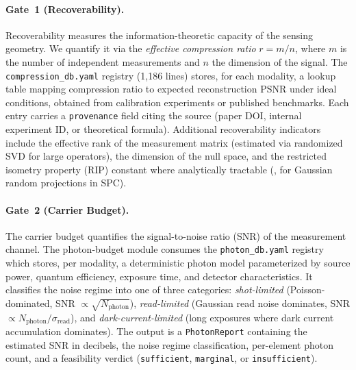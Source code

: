 \paragraph{Gate~1 (Recoverability).}
Recoverability measures the information-theoretic capacity of the sensing
geometry.  We quantify it via the \emph{effective compression ratio}
$r = m / n$, where $m$ is the number of independent measurements and $n$
the dimension of the signal.  The \texttt{compression\_db.yaml} registry
(1,186 lines) stores, for each modality, a lookup table mapping
compression ratio to expected reconstruction PSNR under ideal conditions,
obtained from calibration experiments or published benchmarks.  Each entry
carries a \texttt{provenance} field citing the source (paper DOI, internal
experiment ID, or theoretical formula).  Additional recoverability
indicators include the effective rank of the measurement matrix (estimated
via randomized SVD for large operators), the dimension of the null space,
and the restricted isometry property (RIP) constant where analytically
tractable (\eg{}, for Gaussian random projections in SPC).

\paragraph{Gate~2 (Carrier Budget).}
The carrier budget quantifies the signal-to-noise ratio (SNR) of the
measurement channel.  The photon-budget module consumes the
\texttt{photon\_db.yaml} registry which stores, per modality,
a deterministic photon model parameterized by source power, quantum
efficiency, exposure time, and detector characteristics.  It
classifies the noise regime into one of three categories:
\emph{shot-limited} (Poisson-dominated, SNR $\propto \sqrt{N_{\text{photon}}}$),
\emph{read-limited} (Gaussian read noise dominates, SNR $\propto
N_{\text{photon}} / \sigma_{\text{read}}$), and \emph{dark-current-limited}
(long exposures where dark current accumulation dominates).  The output is
a \texttt{PhotonReport} containing the estimated SNR in decibels, the noise
regime classification, per-element photon count, and a feasibility verdict
(\texttt{sufficient}, \texttt{marginal}, or \texttt{insufficient}).

